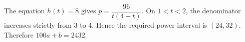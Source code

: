 The equation $h(t)=8$ gives $p=\dfrac{96}{t(4-t)}$. On $1<t<2$, the denominator increases strictly from 3 to 4. Hence the required power interval is $(24,32)$. Therefore $\boxed{100a+b=2432}$.
